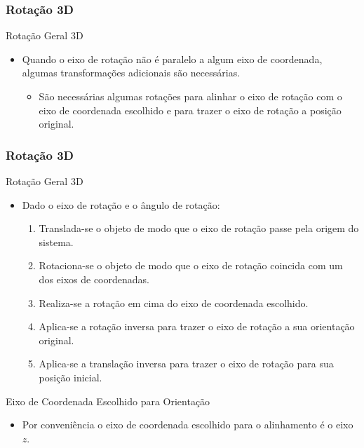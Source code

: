 \documentclass{beamer}
\begin{document}
\begin{frame}
\frametitle{Rotação 3D}


	\begin{block}{Rotação Geral 3D}
		\begin{itemize}
			\item Quando o eixo de rotação não é paralelo a algum eixo de coordenada, algumas transformações adicionais são necessárias.
				\begin{itemize}
					\item São necessárias algumas rotações para alinhar o eixo de rotação com o eixo de coordenada escolhido e para trazer o eixo de rotação a posição original.
				\end{itemize}
		\end{itemize}
	\end{block}
	
\end{frame}

\begin{frame}
\frametitle{Rotação 3D}


	\begin{block}{Rotação Geral 3D}
		\begin{itemize}
			\item Dado o eixo de rotação e o ângulo de rotação:
				\begin{enumerate}
					\item Translada-se o objeto de modo que o eixo de rotação passe pela origem do sistema.
					\item Rotaciona-se o objeto de modo que o eixo de rotação coincida com um dos eixos de coordenadas.
					\item Realiza-se a rotação em cima do eixo de coordenada escolhido.
					\item Aplica-se a rotação inversa para trazer o eixo de rotação a sua orientação original.
					\item Aplica-se a translação inversa para trazer o eixo de rotação para sua posição inicial.
				\end{enumerate}
		\end{itemize}
	\end{block}
	\begin{block}{Eixo de Coordenada Escolhido para Orientação}
		\begin{itemize}
			\item Por conveniência o eixo de coordenada escolhido para o alinhamento é o eixo $z$.
		\end{itemize}
	\end{block}
	
\end{frame}
\end{document}
